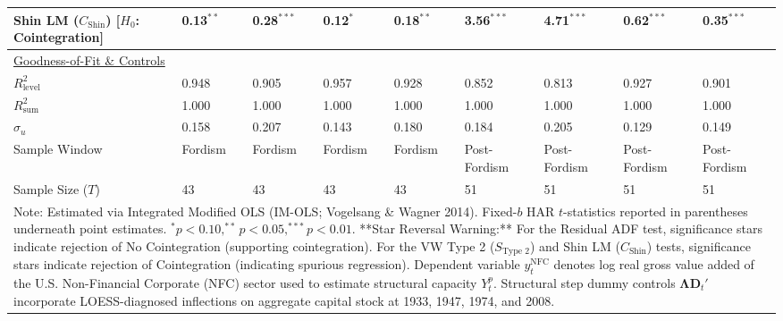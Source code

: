 \begin{landscape}
\begin{table}[H]
\begin{tabular}{p{5.2cm}p{1.5cm}p{1.5cm}p{1.5cm}p{1.5cm}p{1.5cm}p{1.5cm}p{1.5cm}p{1.5cm}}
\makecell[l]{Shin LM ($C_{\text{Shin}}$) \\ {\scriptsize [$H_0$: Cointegration]}} & 0.13$^{**}$ & 0.28$^{***}$ & 0.12$^{*}$ & 0.18$^{**}$ & 3.56$^{***}$ & 4.71$^{***}$ & 0.62$^{***}$ & 0.35$^{***}$  \\
\midrule
\multicolumn{9}{l}{\underline{Goodness-of-Fit \& Controls}} \\
$R_{\text{level}}^2$ & 0.948 & 0.905 & 0.957 & 0.928 & 0.852 & 0.813 & 0.927 & 0.901  \\
$R_{\text{sum}}^2$ & 1.000 & 1.000 & 1.000 & 1.000 & 1.000 & 1.000 & 1.000 & 1.000  \\
$\hat{\sigma}_u$ & 0.158 & 0.207 & 0.143 & 0.180 & 0.184 & 0.205 & 0.129 & 0.149  \\
Sample Window & Fordism & Fordism & Fordism & Fordism & Post-Fordism & Post-Fordism & Post-Fordism & Post-Fordism  \\
Sample Size ($T$) & 43 & 43 & 43 & 43 & 51 & 51 & 51 & 51  \\
\bottomrule
\multicolumn{9}{p{18.5cm}}{\footnotesize Note: Estimated via Integrated Modified OLS (IM-OLS; Vogelsang \& Wagner 2014). Fixed-$b$ HAR $t$-statistics reported in parentheses underneath point estimates. $^*p<0.10, ^{**}p<0.05, ^{***}p<0.01$. **Star Reversal Warning:** For the Residual ADF test, significance stars indicate rejection of No Cointegration (supporting cointegration). For the VW Type 2 ($S_{\text{Type 2}}$) and Shin LM ($C_{\text{Shin}}$) tests, significance stars indicate rejection of Cointegration (indicating spurious regression). Dependent variable $y_t^{\text{NFC}}$ denotes log real gross value added of the U.S. Non-Financial Corporate (NFC) sector used to estimate structural capacity $Y_t^p$. Structural step dummy controls $\boldsymbol{\Lambda} \mathbf{D}_t'$ incorporate LOESS-diagnosed inflections on aggregate capital stock at 1933, 1947, 1974, and 2008.}
\end{tabular}
\end{table}
\end{landscape}
